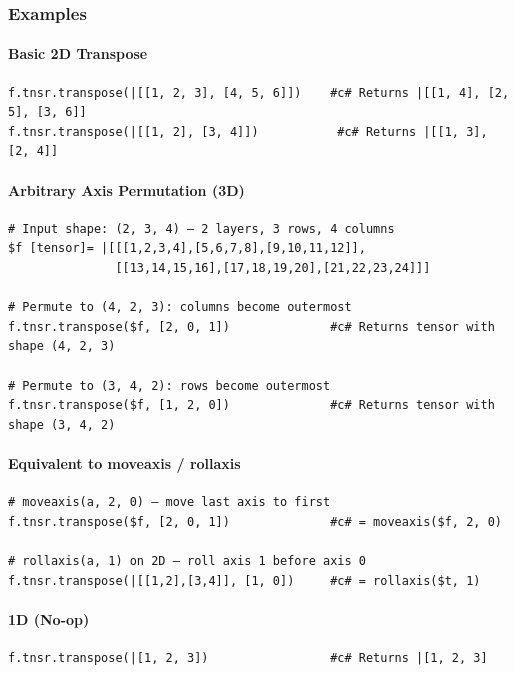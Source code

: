 \subsubsection{Examples}

\paragraph{Basic 2D Transpose}
\begin{verbatim}
f.tnsr.transpose(|[[1, 2, 3], [4, 5, 6]])    #c# Returns |[[1, 4], [2, 5], [3, 6]]
f.tnsr.transpose(|[[1, 2], [3, 4]])           #c# Returns |[[1, 3], [2, 4]]
\end{verbatim}

\paragraph{Arbitrary Axis Permutation (3D)}
\begin{verbatim}
# Input shape: (2, 3, 4) — 2 layers, 3 rows, 4 columns
$f [tensor]= |[[[1,2,3,4],[5,6,7,8],[9,10,11,12]],
               [[13,14,15,16],[17,18,19,20],[21,22,23,24]]]

# Permute to (4, 2, 3): columns become outermost
f.tnsr.transpose($f, [2, 0, 1])              #c# Returns tensor with shape (4, 2, 3)

# Permute to (3, 4, 2): rows become outermost
f.tnsr.transpose($f, [1, 2, 0])              #c# Returns tensor with shape (3, 4, 2)
\end{verbatim}

\paragraph{Equivalent to moveaxis / rollaxis}
\begin{verbatim}
# moveaxis(a, 2, 0) — move last axis to first
f.tnsr.transpose($f, [2, 0, 1])              #c# = moveaxis($f, 2, 0)

# rollaxis(a, 1) on 2D — roll axis 1 before axis 0
f.tnsr.transpose(|[[1,2],[3,4]], [1, 0])     #c# = rollaxis($t, 1)
\end{verbatim}

\paragraph{1D (No-op)}
\begin{verbatim}
f.tnsr.transpose(|[1, 2, 3])                 #c# Returns |[1, 2, 3]
\end{verbatim}

